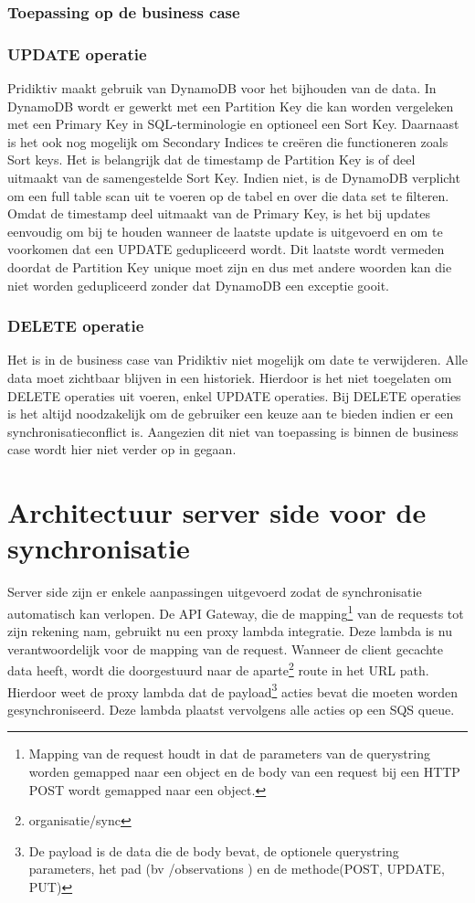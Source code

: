 \subsubsection{Toepassing op de business case}
\subsubsection{UPDATE operatie}
Pridiktiv maakt gebruik van DynamoDB voor het bijhouden van de data. In DynamoDB wordt er gewerkt met een Partition Key die kan worden vergeleken met een Primary Key in SQL-terminologie en optioneel een Sort Key. Daarnaast is het ook nog mogelijk om Secondary Indices te cre\"eren die functioneren zoals Sort keys.  Het is belangrijk dat de timestamp de Partition Key is of deel uitmaakt van de samengestelde Sort Key. Indien niet, is de DynamoDB verplicht om een full table scan uit te voeren op de tabel en over die data set te filteren. Omdat de timestamp deel uitmaakt van de Primary Key, is het bij updates eenvoudig om bij te houden wanneer de laatste update is uitgevoerd en om te voorkomen dat een UPDATE gedupliceerd wordt. Dit laatste wordt vermeden doordat de Partition Key unique moet zijn en dus met andere woorden kan die niet worden gedupliceerd zonder dat DynamoDB een exceptie gooit.
\subsubsection{DELETE operatie}
Het is in de business case van Pridiktiv niet mogelijk om date te verwijderen. Alle data moet zichtbaar blijven in een historiek. Hierdoor is het niet toegelaten om DELETE operaties uit voeren, enkel UPDATE operaties. Bij DELETE operaties is het altijd noodzakelijk om de gebruiker een keuze aan te bieden indien er een synchronisatieconflict is. Aangezien dit niet van toepassing is binnen de business case wordt hier niet verder op in gegaan.

\section{Architectuur server side voor de synchronisatie}
Server side zijn er enkele aanpassingen uitgevoerd zodat de synchronisatie automatisch kan verlopen. De API Gateway, die de mapping\footnote{Mapping van de request houdt in dat de parameters van de querystring worden gemapped naar een object en de body van een request bij een HTTP POST wordt gemapped naar een object.} van de requests tot zijn rekening nam, gebruikt nu een proxy lambda integratie. Deze lambda is nu verantwoordelijk voor de mapping van de request. Wanneer de client gecachte data heeft, wordt die doorgestuurd naar de aparte\footnote{ organisatie/sync } route in het URL path. Hierdoor weet de proxy lambda dat de payload\footnote{De payload is de data die de body bevat, de optionele querystring parameters, het pad (bv /observations ) en de methode(POST, UPDATE, PUT)} acties bevat die moeten worden gesynchroniseerd. Deze lambda plaatst vervolgens alle acties op een SQS queue.

